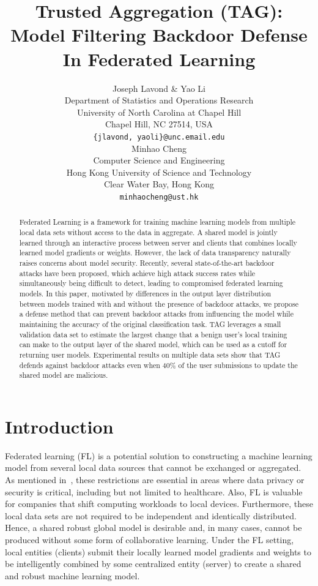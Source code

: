 \documentclass{article} %
\title{
    Trusted Aggregation (TAG): Model Filtering Backdoor Defense In Federated Learning
}
\author{%
    Joseph Lavond \& Yao Li  \\
    Department of Statistics and Operations Research \\
    University of North Carolina at Chapel Hill \\
    Chapel Hill, NC 27514, USA \\
    \texttt{\{jlavond, yaoli\}@unc.email.edu} \\
    \And
    Minhao Cheng \\
    Computer Science and Engineering \\
    Hong Kong University of Science and Technology \\
    Clear Water Bay, Hong Kong \\
    \texttt{minhaocheng@ust.hk}
}
\begin{document}
\maketitle


\begin{abstract}
Federated Learning is a framework for training machine learning models from multiple local data sets without access to the data in aggregate. A shared model is jointly learned through an interactive process between server and clients that combines locally learned model gradients or weights. However, the lack of data transparency naturally raises concerns about model security. Recently, several state-of-the-art backdoor attacks have been proposed, which achieve high attack success rates while simultaneously being difficult to detect, leading to compromised federated learning models. In this paper, motivated by differences in the output layer distribution between models trained with and without the presence of backdoor attacks, we propose a defense method that can prevent backdoor attacks from influencing the model while maintaining the accuracy of the original classification task. TAG leverages a small validation data set to estimate the largest change that a benign user's local training can make to the output layer of the shared model, which can be used as a cutoff for returning user models. Experimental results on multiple data sets show that TAG defends against backdoor attacks even when 40\% of the user submissions to update the shared model are malicious.
\end{abstract}

\vspace{-10pt}
\section{Introduction}

Federated learning (FL) is a potential solution to constructing a machine learning model from several local data sources that cannot be exchanged or aggregated. As mentioned in~\cite{fed-learn}, these restrictions are essential in areas where data privacy or security is critical, including but not limited to healthcare.  Also, FL is valuable for companies that shift computing workloads to local devices. Furthermore, these local data sets are not required to be independent and identically distributed. Hence, a shared robust global model is desirable and, in many cases, cannot be produced without some form of collaborative learning. Under the FL setting, local entities (clients) submit their locally learned model gradients and weights to be intelligently combined by some centralized entity (server) to create a shared and robust machine learning model.
\end{document}
